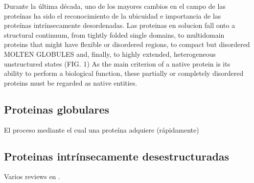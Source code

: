 Durante la última década, uno de los mayores cambios en el campo de las proteínas ha sido el reconocimiento de la ubicuidad e importancia de las proteínas intrínsecamente desordenadas. 
Las proteinas en solucion fall onto a structural continuum, from tightly folded single domains, to multidomain proteins that might have flexible or disordered regions, to compact but disordered MOLTEN GLOBULES and, finally, to highly extended, heterogeneous unstructured states (FIG. 1) 
As the main criterion of a native protein is its ability to perform a biological function, these partially or completely disordered proteins must be regarded as native entities.








\subsection{Proteinas globulares}
El proceso mediante el cual una proteína adquiere (rápidamente) 









\subsection{Proteinas intrínsecamente desestructuradas}

Varios reviews en \cite{uversky2010understanding,dyson2005intrinsically}.

